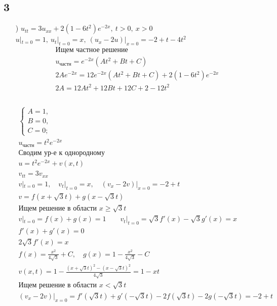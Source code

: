 \subsection{3}
\begin{enumerate}
  \item[\text{а})] $u_{tt}=3u_{xx}+2(1-6t^{2})e^{-2x}, \ t>0, \ x>0$ \\
    $u|_{t=0}=1, \ u_{t}|_{t=0}=x, \ (u_{x}-2u)|_{x=0}=-2+t-4t^{2}$ \\
    \begin{gather*}
      \text{Ищем частное решение} \\
    u_{\text{частн}} = e^{-2x}(At^{2}+Bt+C) \\
    2Ae^{-2x}=12e^{-2x}(At^{2}+Bt+C)+2(1-6t^{2})e^{-2x} \\
    2A=12At^{2}+12Bt+12C+2-12t^{2} \\
    \end{gather*} \\
    \begin{gather*}
    \begin{cases}
      A = 1, \\ B = 0, \\ C = 0;
    \end{cases} \\
    u_{\text{частн}} = t^{2}e^{-2x} \\
    \text{Сводим ур-е к однородному} \\
    u = t^{2}e^{-2x}+v(x,t) \\
    v_{tt}=3v_{xx} \\ v|_{t=0}=1, \quad v_{t}|_{t=0}=x, \quad
    (v_{x}-2v)|_{x=0}=-2+t \\
    v = f(x +\sqrt{3}t)+g(x-\sqrt{3}t) \\
    \text{Ищем решение в области $x \geq \sqrt{3}t$ }\\
    v|_{t=0}=f(x)+g(x)=1 \qquad v_{t}|_{t=0}=\sqrt{3}f'(x)-\sqrt{3}g'(x)=x \\
    f'(x)+g'(x)=0 \\
    2 \sqrt{3}f'(x) = x\\ 
    \boxed{f(x)= \frac{x^{2}}{4 \sqrt{3}} + C, \quad g(x) =1 - \frac{x^{2}}{4 \sqrt{3}} - C}\\
    v(x,t) = 1 - \frac{(x+ \sqrt{3}t)^{2}-(x - \sqrt{3}t)^{2}}{4 \sqrt{3}} = 1 -xt \\
    \text{Ищем решение в области $x < \sqrt{3}t$} \\
    (v_{x}-2v)|_{x=0}=f'(\sqrt{3}t)+g'(-\sqrt{3}t)-2f(\sqrt{3}t)-2g(-\sqrt{3}t)=-2+t \\

\end{gather*}
\end{enumerate}
